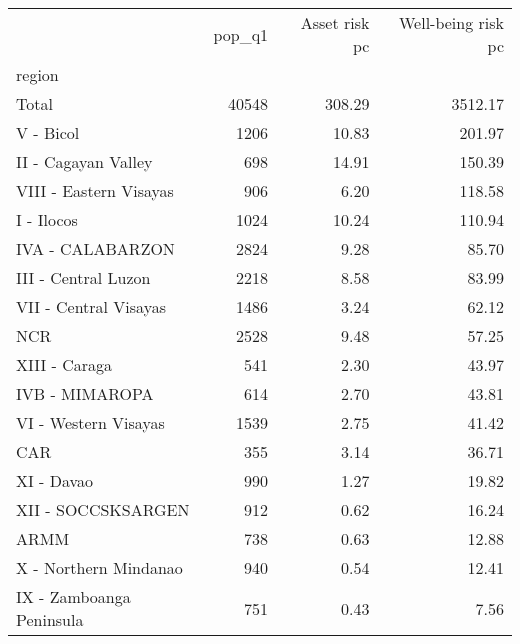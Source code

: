 \begin{tabular}{lrrr}
\toprule
{} &  pop\_q1 &  Asset risk pc &  Well-being risk pc \\
region                   &         &                &                     \\
\midrule
Total                    &   40548 &         308.29 &             3512.17 \\
V - Bicol                &    1206 &          10.83 &              201.97 \\
II - Cagayan Valley      &     698 &          14.91 &              150.39 \\
VIII - Eastern Visayas   &     906 &           6.20 &              118.58 \\
I - Ilocos               &    1024 &          10.24 &              110.94 \\
IVA - CALABARZON         &    2824 &           9.28 &               85.70 \\
III - Central Luzon      &    2218 &           8.58 &               83.99 \\
VII - Central Visayas    &    1486 &           3.24 &               62.12 \\
NCR                      &    2528 &           9.48 &               57.25 \\
XIII - Caraga            &     541 &           2.30 &               43.97 \\
IVB - MIMAROPA           &     614 &           2.70 &               43.81 \\
VI - Western Visayas     &    1539 &           2.75 &               41.42 \\
CAR                      &     355 &           3.14 &               36.71 \\
XI - Davao               &     990 &           1.27 &               19.82 \\
XII - SOCCSKSARGEN       &     912 &           0.62 &               16.24 \\
ARMM                     &     738 &           0.63 &               12.88 \\
X - Northern Mindanao    &     940 &           0.54 &               12.41 \\
IX - Zamboanga Peninsula &     751 &           0.43 &                7.56 \\
\bottomrule
\end{tabular}

